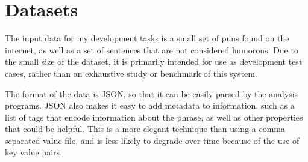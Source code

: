 \section{Datasets}
The input data for my development tasks is a small set of puns found on the internet, as well as a set of sentences that are not considered humorous. Due to the small size of the dataset, it is primarily intended for use as development test cases, rather than an exhaustive study or benchmark of this system.

The format of the data is JSON, so that it can be easily parsed by the analysis programs. JSON also makes it easy to add metadata to information, such as a list of tags that encode information about the phrase, as well as other properties that could be helpful. This is a more elegant technique than using a comma separated value file, and is less likely to degrade over time because of the use of key value pairs.
